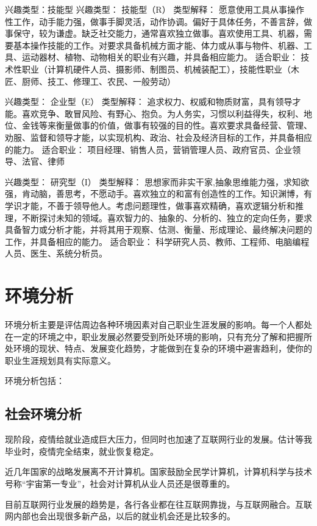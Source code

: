 \documentclass{article}
\begin{document}
兴趣类型：技能型
兴趣类型：
技能型（R）
类型解释：
愿意使用工具从事操作性工作，动手能力强，做事手脚灵活，动作协调。偏好于具体任务，不善言辞，做事保守，较为谦虚。缺乏社交能力，通常喜欢独立做事。喜欢使用工具、机器，需要基本操作技能的工作。对要求具备机械方面才能、体力或从事与物件、机器、工具、运动器材、植物、动物相关的职业有兴趣，并具备相应能力。
适合职业：
技术性职业（计算机硬件人员、摄影师、制图员、机械装配工），技能性职业（木匠、厨师、技工、修理工、农民、一般劳动）\par
兴趣类型：
企业型（E）
类型解释：
追求权力、权威和物质财富，具有领导才能。喜欢竞争、敢冒风险、有野心、抱负。为人务实，习惯以利益得失，权利、地位、金钱等来衡量做事的价值，做事有较强的目的性。喜欢要求具备经营、管理、劝服、监督和领导才能，以实现机构、政治、社会及经济目标的工作，并具备相应的能力。
适合职业：
项目经理、销售人员，营销管理人员、政府官员、企业领导、法官、律师\par
兴趣类型：
研究型（I）
类型解释：
思想家而非实干家,抽象思维能力强，求知欲强，肯动脑，善思考，不愿动手。喜欢独立的和富有创造性的工作。知识渊博，有学识才能，不善于领导他人。考虑问题理性，做事喜欢精确，喜欢逻辑分析和推理，不断探讨未知的领域。喜欢智力的、抽象的、分析的、独立的定向任务，要求具备智力或分析才能，并将其用于观察、估测、衡量、形成理论、最终解决问题的工作，并具备相应的能力。
适合职业：
科学研究人员、教师、工程师、电脑编程人员、医生、系统分析员。\par
\section{环境分析}
环境分析主要是评估周边各种环境因素对自己职业生涯发展的影响。每一个人都处在一定的环境之中，职业发展必然要受到所处环境的影响，只有充分了解和把握所处环境的现状、特点、发展变化趋势，才能做到在复杂的环境中避害趋利，使你的职业生涯规划具有实际意义。\par
环境分析包括：\par
\subsection{社会环境分析}
现阶段，疫情给就业造成巨大压力，但同时也加速了互联网行业的发展。估计等我毕业时，疫情完全结束，就业恢复稳定。\par
近几年国家的战略发展离不开计算机。国家鼓励全民学计算机，计算机科学与技术号称“宇宙第一专业”，社会对计算机从业人员还是很尊重的。\par
目前互联网行业发展的趋势是，各行各业都在往互联网靠拢，与互联网融合。互联网内部也会出现很多新产品，以后的就业机会还是比较多的。\par
\end{document}
